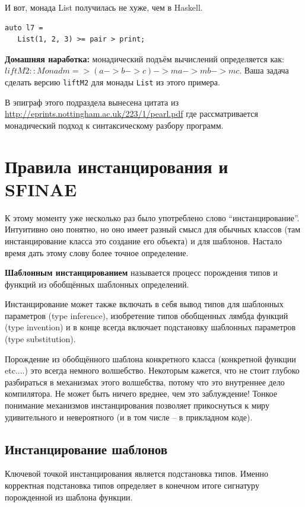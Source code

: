 \documentclass[a4paper,12pt,oneside]{book}
\begin{document}
И вот, монада List получилась не хуже, чем в Haskell.

\begin{lstlisting}
auto l7 = 
   List(1, 2, 3) >= pair > print;
\end{lstlisting}

\textbf{Домашняя наработка:} монадический подъём вычислений определяется как:
$liftM2 :: Monad m => (a -> b -> c) -> m a -> m b -> m c$.
Ваша задача сделать версию \lstinline!liftM2! для монады \lstinline!List! из этого примера.

В эпиграф этого подраздела вынесена цитата из \url{http://eprints.nottingham.ac.uk/223/1/pearl.pdf} где рассматривается монадический подход к синтаксическому разбору программ.

\pagebreak
\section{Правила инстанцирования и SFINAE}\label{SFINAESection}

К этому моменту уже несколько раз было употреблено слово ``инстанцирование''. Интуитивно оно понятно, но оно имеет разный смысл для обычных классов (там инстанцирование класса это создание его объекта) и для шаблонов. Настало время дать этому слову более точное определение.

\textbf{Шаблонным инстанцированием} называется процесс порождения типов и функций из обобщённых шаблонных определений.

Инстанцирование может также включать в себя вывод типов для шаблонных параметров (type inference), изобретение типов обобщенных лямбда функций (type invention) и в конце всегда включает подстановку шаблонных параметров (type substitution).

Порождение из обобщённого шаблона конкретного класса (конкретной функции etc....) это всегда немного волшебство. Некоторым кажется, что не стоит глубоко разбираться в механизмах этого волшебства, потому что это внутреннее дело компилятора. Не может быть ничего вреднее, чем это заблуждение! Тонкое понимание механизмов инстанцирования позволяет прикоснуться к миру удивительного и невероятного (и в том числе -- в прикладном коде).

\subsection{Инстанцирование шаблонов}\label{Templateinstancing}

Ключевой точкой инстанцирования является подстановка типов. Именно корректная подстановка типов определяет в конечном итоге сигнатуру порожденной из шаблона функции.
\end{document}
